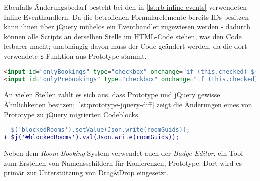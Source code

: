 Ebenfalls Änderungsbedarf besteht bei den in \autoref{lst:rb-inline-events} verwendeten
Inline-Eventhandlern. Da die betroffenen Formularelemente bereits IDs besitzen kann ihnen über
jQuery mühelos ein Eventhandler zugewiesen werden - dadurch können alle Scripts an derselben Stelle
im HTML-Code stehen, was den Code lesbarer macht; unabhängig davon muss der Code geändert werden, da
die dort verwendete \lstinline{$}-Funktion aus Prototype stammt.

\begin{lstlisting}[language=HTML,caption=Inline-Eventhandler]
<input id="onlyBookings" type="checkbox" onchange="if (this.checked) $('onlyPrebookings').checked = false;"/>
<input id="onlyPrebookings" type="checkbox" onchange="if (this.checked) $('onlyBookings').checked = false;" />
\end{lstlisting}

An vielen Stellen zahlt es sich aus, dass Prototype und jQuery gewisse Ähnlichkeiten besitzen;
\autoref{lst:prototype-jquery-diff} zeigt die Änderungen eines von Prototype zu jQuery migrierten
Codeblocks.

\begin{lstlisting}[language=diff,label=lst:prototype-jquery-diff,caption=Ähnlichkeit zwischen jQuery und Prototype]
- $('blockedRooms').setValue(Json.write(roomGuids));
+ $j('#blockedRooms').val(Json.write(roomGuids));
\end{lstlisting}

Neben dem \emph{Room Booking}-System verwendet auch der \emph{Badge Editor}, ein Tool zum Erstellen
von Namensschildern für Konferenzen, Prototype. Dort wird es primär zur Unterstützung von Drag\&Drop
eingesetzt.

